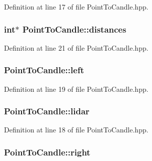 Definition at line 17 of file Point\-To\-Candle.\-hpp.

\hypertarget{classPointToCandle_aa905d6ae2cd3d72225020c87f74e30e0}{
\subsubsection[{distances}]{\setlength{\rightskip}{0pt plus 5cm}int$\ast$ Point\-To\-Candle\-::distances\hspace{0.3cm}{\ttfamily [private]}}}\label{classPointToCandle_aa905d6ae2cd3d72225020c87f74e30e0}


Definition at line 21 of file Point\-To\-Candle.\-hpp.

\hypertarget{classPointToCandle_a8976db9c7a0e1484762bf27c829cb06f}{
\subsubsection[{left}]{ Point\-To\-Candle\-::left\hspace{0.3cm}{\ttfamily [private]}}}\label{classPointToCandle_a8976db9c7a0e1484762bf27c829cb06f}


Definition at line 19 of file Point\-To\-Candle.\-hpp.

\hypertarget{classPointToCandle_a74def04bd7985f1ae2dfb83cb4ad7d40}{
\subsubsection[{lidar}]{ Point\-To\-Candle\-::lidar\hspace{0.3cm}{\ttfamily [private]}}}\label{classPointToCandle_a74def04bd7985f1ae2dfb83cb4ad7d40}


Definition at line 18 of file Point\-To\-Candle.\-hpp.

\hypertarget{classPointToCandle_ad0913e5dfa04c7205c16cc893ff238c5}{
\subsubsection[{right}]{ Point\-To\-Candle\-::right\hspace{0.3cm}{\ttfamily [private]}}}\label{classPointToCandle_ad0913e5dfa04c7205c16cc893ff238c5}


